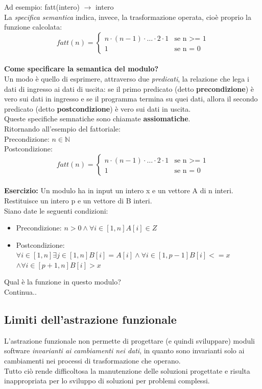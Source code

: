 \documentclass{article}
\begin{document}
	Ad esempio: fatt(intero) $\rightarrow$ intero 
	\vspace{\baselineskip}\\
	La \textit{specifica semantica} indica, invece, la trasformazione operata, cioè proprio la funzione calcolata: 
		\[
		fatt(n) = 
		\begin{cases}
			n \cdot (n-1) \cdot \ldots \cdot 2 \cdot 1 & \text{se n $>$= 1} \\
			1 & \text{se n = 0}
		\end{cases}
		\]
	\\ \textbf{Come specificare la semantica del modulo?}\\
	Un modo è quello di esprimere, attraverso due \textit{predicati}, la relazione che lega i dati di ingresso ai dati di uscita: se il primo predicato (detto \textbf{precondizione}) è vero sui dati in ingresso e se il programma termina su quei dati, allora il secondo predicato (detto \textbf{postcondizione}) è vero sui dati in uscita.\\Queste specifiche semnatiche sono chiamate \textbf{assiomatiche}.
	\vspace{\baselineskip}\\
	Ritornando all'esempio del fattoriale:\\
	Precondizione: $n \in \mathbb{N}$\\
	Postcondizione: 
	\[
	fatt(n) = 
	\begin{cases}
		n \cdot (n-1) \cdot \ldots \cdot 2 \cdot 1 & \text{se n $>$= 1} \\
		1 & \text{se n = 0}
	\end{cases}
	\]
	\\
	\textbf{Esercizio:} Un modulo ha in input un intero x e un vettore A di n interi. Restituisce un intero p e un vettore di B interi. \\
	Siano date le seguenti condizioni:
	\begin{itemize}
		\item Precondizione:  $ n>0  \land \forall i \in[1,n]  A[i] \in Z  $ 
		\item Postcondizione: $ \forall i \in [1,n] \exists j \in [1,n]  B[i]=A[i] \land \forall i \in[1,p-1] B[i] <= x $ 
			\newline 
			$\land \forall i \in[p+1,n] B[i]>x  $
	\end{itemize}
	Qual è la funzione in questo modulo? \\
	Continua.. \\
	
	\subsection{Limiti dell'astrazione funzionale}
	L'astrazione funzionale non permette di progettare (e quindi sviluppare) moduli software \textit{invarianti ai cambiamenti nei dati}, in quanto sono invarianti solo ai cambiamenti nei processi di trasformazione che operano. \\
	Tutto ciò rende difficoltosa la manutenzione delle soluzioni progettate e risulta inappropriata per lo sviluppo di soluzioni per problemi complessi.
	
\end{document}
